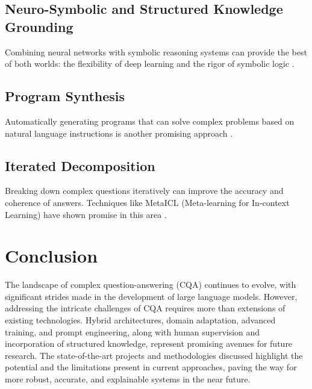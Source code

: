 \documentclass{article}
\begin{document}
\subsection{Neuro-Symbolic and Structured Knowledge Grounding}
Combining neural networks with symbolic reasoning systems can provide the best of both worlds: the flexibility of deep learning and the rigor of symbolic logic \cite{rosenblatt2021system}.

\subsection{Program Synthesis}
Automatically generating programs that can solve complex problems based on natural language instructions is another promising approach \cite{chen2021evaluating}.

\subsection{Iterated Decomposition}
Breaking down complex questions iteratively can improve the accuracy and coherence of answers. Techniques like MetaICL (Meta-learning for In-context Learning) have shown promise in this area \cite{yan2021metaicl}.

\section{Conclusion}
\label{sec:conclusion}

The landscape of complex question-answering (CQA) continues to evolve, with significant strides made in the development of large language models. However, addressing the intricate challenges of CQA requires more than extensions of existing technologies. Hybrid architectures, domain adaptation, advanced training, and prompt engineering, along with human supervision and incorporation of structured knowledge, represent promising avenues for future research. The state-of-the-art projects and methodologies discussed highlight the potential and the limitations present in current approaches, paving the way for more robust, accurate, and explainable systems in the near future.



\end{document}
